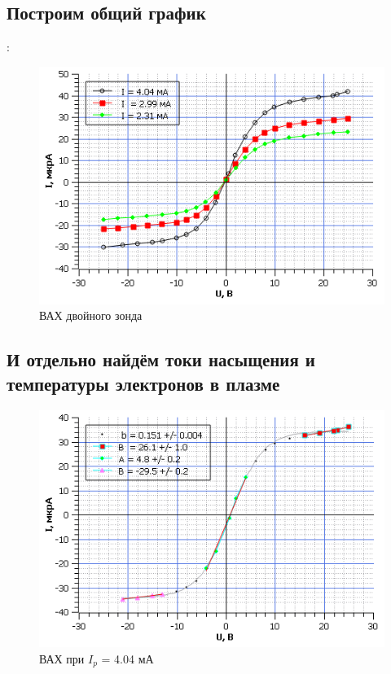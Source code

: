 \begin{enumerate}
\subsection{Построим общий график}:
\begin{figure}[h!]
    \centering
    \includegraphics[scale=1.2]{ВАХ_2.png}
    \caption{ВАХ двойного зонда}
    \label{fig:ref_to_this_foto}
\end{figure}

\subsection{И отдельно найдём токи насыщения и температуры электронов в плазме}
\begin{figure}[h!]
    \centering
    \includegraphics[scale=1.2]{ВАХ_404.png}
    \caption{ВАХ при $I_p$ = 4.04 мА}
    \label{fig:ref_to_this_foto}
\end{figure}


\end{enumerate}
